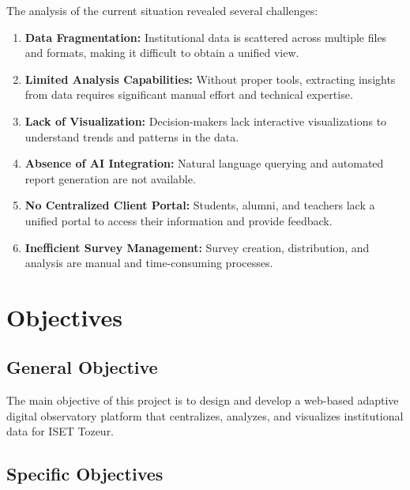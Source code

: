 \documentclass[12pt,a4paper]{report}
\begin{document}
The analysis of the current situation revealed several challenges:
\begin{enumerate}
    \item \textbf{Data Fragmentation:} Institutional data is scattered across multiple files and formats, making it difficult to obtain a unified view.
    \item \textbf{Limited Analysis Capabilities:} Without proper tools, extracting insights from data requires significant manual effort and technical expertise.
    \item \textbf{Lack of Visualization:} Decision-makers lack interactive visualizations to understand trends and patterns in the data.
    \item \textbf{Absence of AI Integration:} Natural language querying and automated report generation are not available.
    \item \textbf{No Centralized Client Portal:} Students, alumni, and teachers lack a unified portal to access their information and provide feedback.
    \item \textbf{Inefficient Survey Management:} Survey creation, distribution, and analysis are manual and time-consuming processes.
\end{enumerate}

\section{Objectives}

\subsection{General Objective}

The main objective of this project is to design and develop a web-based adaptive digital observatory platform that centralizes, analyzes, and visualizes institutional data for ISET Tozeur.

\subsection{Specific Objectives}
\end{document}
